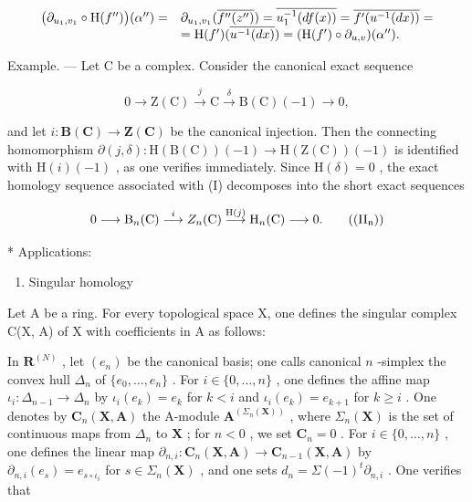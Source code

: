 \[
\begin{array}{r l} \big (\partial_ {u _ {1}, v _ {1}} \circ \mathrm{H} (f ^ {\prime \prime}) \big) (\alpha^ {\prime \prime}) = & \partial_ {u _ {1}, v _ {1}} (\overline {{f ^ {\prime \prime} (z ^ {\prime \prime})}}) = \overline {{u _ {1} ^ {- 1} (d f (x))}} = \overline {{f ^ {\prime} (u ^ {- 1} (d x))}} = \\ & = \mathrm{H} (f ^ {\prime}) (\overline {{u ^ {- 1} (d x)}}) = (\mathrm{H} (f ^ {\prime}) \circ \partial_ {u, v}) (\alpha^ {\prime \prime}). \end{array}
\]

Example. — Let C be a complex. Consider the canonical exact sequence

\[
0 \longrightarrow \mathrm{Z} (\mathrm{C}) \stackrel {j} {\longrightarrow} \mathrm{C} \stackrel {\delta} {\longrightarrow} \mathrm{B} (\mathrm{C}) (- 1) \longrightarrow 0,\tag{I}
\]

and let \(i: \mathbf{B}(\mathbf{C}) \to \mathbf{Z}(\mathbf{C})\) be the canonical injection. Then the connecting homomorphism \(\partial(j, \delta): \mathrm{H}(\mathrm{B}(\mathrm{C})) (-1) \to \mathrm{H}(\mathrm{Z}(\mathrm{C})) (-1)\) is identified with \(\mathrm{H}(i) (-1)\) , as one verifies immediately. Since \(\mathrm{H}(\delta) = 0\) , the exact homology sequence associated with (I) decomposes into the short exact sequences

\[
0 \longrightarrow \mathrm{B} _ {n} (\mathrm{C}) \stackrel {i} {\longrightarrow} Z _ {n} (\mathrm{C}) \stackrel {\mathrm{H} (j)} {\longrightarrow} \mathrm{H} _ {n} (\mathrm{C}) \longrightarrow 0.\tag{\((\mathrm{II}_{\mathfrak{n}})\)}
\]

* Applications:

\begin{enumerate}
\def\labelenumi{\arabic{enumi})}
\tightlist
\item
  Singular homology
\end{enumerate}

Let A be a ring. For every topological space X, one defines the singular complex C(X, A) of X with coefficients in A as follows:

In \(\mathbf{R}^{(N)}\) , let \((e_n)\) be the canonical basis; one calls canonical \(n\) -simplex the convex hull \(\Delta_n\) of \(\{e_0, \ldots, e_n\}\) . For \(i \in \{0, \ldots, n\}\) , one defines the affine map \(\iota_i: \Delta_{n-1} \to \Delta_n\) by \(\iota_i(e_k) = e_k\) for \(k < i\) and \(\iota_i(e_k) = e_{k+1}\) for \(k \geqslant i\) . One denotes by \(\mathbf{C}_n(\mathbf{X}, \mathbf{A})\) the A-module \(\mathbf{A}^{(\Sigma_n(\mathbf{X}))}\) , where \(\Sigma_n(\mathbf{X})\) is the set of continuous maps from \(\Delta_n\) to \(\mathbf{X}\) ; for \(n < 0\) , we set \(\mathbf{C}_n = 0\) . For \(i \in \{0, \ldots, n\}\) , one defines the linear map \(\partial_{n,i}: \mathbf{C}_n(\mathbf{X}, \mathbf{A}) \to \mathbf{C}_{n-1}(\mathbf{X}, \mathbf{A})\) by \(\partial_{n,i}(e_s) = e_{s \circ \iota_i}\) for \(s \in \Sigma_n(\mathbf{X})\) , and one sets \(d_n = \Sigma (-1)^t \partial_{n,i}\) . One verifies that

